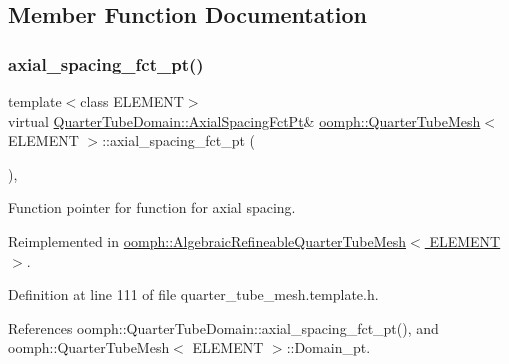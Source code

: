\subsection{Member Function Documentation}
\mbox{\label{classoomph_1_1QuarterTubeMesh_a5c880d6214a07676a533227f813634d8}} 
\subsubsection{\texorpdfstring{axial\+\_\+spacing\+\_\+fct\+\_\+pt()}{axial\_spacing\_fct\_pt()}}
{\footnotesize\ttfamily template$<$class E\+L\+E\+M\+E\+NT$>$ \\
virtual \hyperlink{classoomph_1_1QuarterTubeDomain_ae347af42a5dcb9b3b82c2247975b01db}{Quarter\+Tube\+Domain\+::\+Axial\+Spacing\+Fct\+Pt}\& \hyperlink{classoomph_1_1QuarterTubeMesh}{oomph\+::\+Quarter\+Tube\+Mesh}$<$ E\+L\+E\+M\+E\+NT $>$\+::axial\+\_\+spacing\+\_\+fct\+\_\+pt (\begin{DoxyParamCaption}{ }\end{DoxyParamCaption})\hspace{0.3cm}{\ttfamily [inline]}, {\ttfamily [virtual]}}



Function pointer for function for axial spacing. 



Reimplemented in \hyperlink{classoomph_1_1AlgebraicRefineableQuarterTubeMesh_ac6518f83dd81c5ef1a8d908be8c9f473}{oomph\+::\+Algebraic\+Refineable\+Quarter\+Tube\+Mesh$<$ E\+L\+E\+M\+E\+N\+T $>$}.



Definition at line 111 of file quarter\+\_\+tube\+\_\+mesh.\+template.\+h.



References oomph\+::\+Quarter\+Tube\+Domain\+::axial\+\_\+spacing\+\_\+fct\+\_\+pt(), and oomph\+::\+Quarter\+Tube\+Mesh$<$ E\+L\+E\+M\+E\+N\+T $>$\+::\+Domain\+\_\+pt.

\mbox{\label{classoomph_1_1QuarterTubeMesh_afa145689b62afa7e66573c8c42bda8dd}} 
